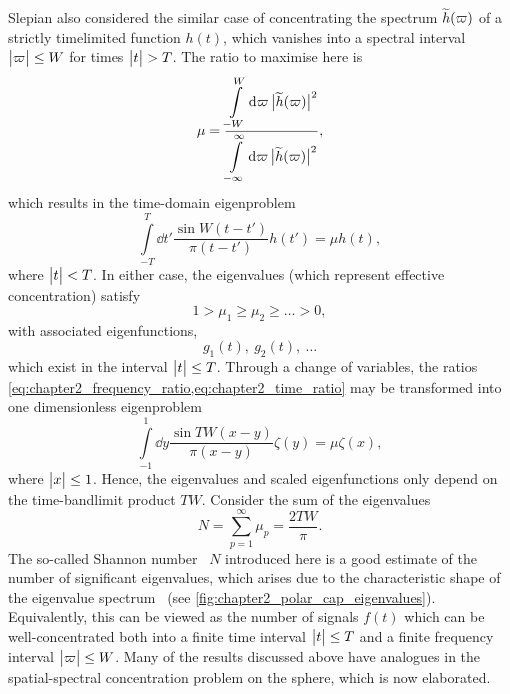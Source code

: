 Slepian \etal{} also considered the similar case of concentrating the spectrum \(\widetilde{h}(\varpi)\) of a strictly timelimited function \(h(t)\), which vanishes into a spectral interval \(\big\lvert\varpi\big\rvert \leq W\) for times \(\big\lvert t\big\rvert > T\).
The ratio to maximise here is
%
\begin{equation}\label{eq:chapter2_time_ratio}
	\mu
	= \frac{\displaystyle\int\limits_{-W}^{W} \dd{\varpi} \big\lvert\widetilde{h}(\varpi)\big\rvert^{2}}
	{\displaystyle\int\limits_{-\infty}^{\infty} \dd{\varpi} \big\lvert\widetilde{h}(\varpi)\big\rvert^{2}},
\end{equation}
%
which results in the time-domain eigenproblem
%
\begin{equation}\label{eq:chapter2_time_eigenproblem}
	\int\limits_{-T}^{T} \dd{t'} \frac{\sin{W(t-t')}}{\pi(t-t')} h(t')
	= \mu h(t),
\end{equation}
%
where \(\big\lvert t\big\rvert < T\).
In either case, the eigenvalues (which represent effective concentration) satisfy
%
\begin{equation}
	1 > \mu_{1} \geq \mu_{2} \geq \ldots > 0, %
\end{equation}
%
with associated eigenfunctions, \eg{}
%
\begin{equation}
	g_{1}(t),\ g_{2}(t),\ \ldots
\end{equation}
%
which exist in the interval \(\big\lvert t\big\rvert \leq T\).
Through a change of variables, the ratios \cref{eq:chapter2_frequency_ratio,eq:chapter2_time_ratio} may be transformed into one dimensionless eigenproblem
%
\begin{equation}
	\int\limits_{-1}^{1} \dd{y} \frac{\sin{TW(x-y)}}{\pi(x-y)} \zeta(y)
	= \mu \zeta(x),
\end{equation}
%
where \(\big\lvert x\big\rvert \leq 1\).
Hence, the eigenvalues and scaled eigenfunctions only depend on the time-bandlimit product \(TW\).
Consider the sum of the eigenvalues
%
\begin{equation}
	N
	= \sum\limits_{p=1}^{\infty} \mu_{p}
	= \frac{2TW}{\pi}.
\end{equation}
%
The so-called Shannon number~\cite{Percival1993} \(N\) introduced here is a good estimate of the number of significant eigenvalues, which arises due to the characteristic shape of the eigenvalue spectrum~\cite{Landau1965,Slepian1965} (see \cref{fig:chapter2_polar_cap_eigenvalues}).
Equivalently, this can be viewed as the number of signals \(f(t)\) which can be well-concentrated both into a finite time interval \(\big\lvert t\big\rvert \leq T\) and a finite frequency interval \(\big\lvert\varpi\big\rvert \leq W\).
Many of the results discussed above have analogues in the spatial-spectral concentration problem on the sphere, which is now elaborated.

